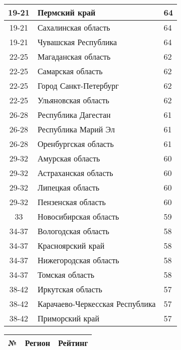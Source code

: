 \begin{table}[p]
\begin{tabular}{|c|l|l|}
      19-21 & Пермский край                     & 64         \\ \hline
      19-21 & Сахалинская область               & 64         \\ \hline
      19-21 & Чувашская Республика              & 64         \\ \hline
      22-25 & Магаданская область               & 62         \\ \hline
      22-25 & Самарская область                 & 62         \\ \hline
      22-25 & Город Санкт-Петербург             & 62         \\ \hline
      22-25 & Ульяновская область               & 62         \\ \hline
      26-28 & Республика Дагестан               & 61         \\ \hline
      26-28 & Республика Марий Эл               & 61         \\ \hline
      26-28 & Оренбургская область              & 61         \\ \hline
      29-32 & Амурская область                  & 60         \\ \hline
      29-32 & Астраханская область              & 60         \\ \hline
      29-32 & Липецкая область                  & 60         \\ \hline
      29-32 & Пензенская область                & 60         \\ \hline
      33    & Новосибирская область             & 59         \\ \hline
      34-37 & Вологодская область               & 58         \\ \hline
      34-37 & Красноярский край                 & 58         \\ \hline
      34-37 & Нижегородская область             & 58         \\ \hline
      34-37 & Томская область                   & 58         \\ \hline
      38-42 & Иркутская область                 & 57         \\ \hline
      38-42 & Карачаево-Черкесская Республика   & 57         \\ \hline
      38-42 & Приморский край                   & 57         \\ \hline
    \end{tabular} \hfill
    \begin{tabular}{|c|l|l|} \hline
      №     & Регион                            & Рейтинг    \\ \hline

\end{tabular}
\end{table}

